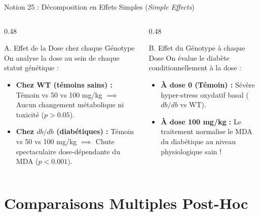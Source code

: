 \documentclass[aspectratio=169,10pt]{beamer}
\begin{document}
\begin{frame}{Notion 25 : Décomposition en Effets Simples (\textit{Simple Effects})}
  \begin{columns}[onlytextwidth, T]
    \begin{column}{0.48\linewidth}
      \begin{biobox}{A. Effet de la Dose chez chaque Génotype}
        \small
        On analyse la dose au sein de chaque statut génétique :
        \begin{itemize}
          \item \textbf{Chez WT (témoins sains) :} Témoin vs 50 vs 100 mg/kg $\implies$ Aucun changement métabolique ni toxicité ($p > 0.05$).
          \item \textbf{Chez $db/db$ (diabétiques) :} Témoin vs 50 vs 100 mg/kg $\implies$ Chute spectaculaire dose-dépendante du MDA ($p < 0.001$).
        \end{itemize}
      \end{biobox}
    \end{column}
    \begin{column}{0.48\linewidth}
      \begin{conceptbox}{B. Effet du Génotype à chaque Dose}
        \small
        On évalue le diabète conditionnellement à la dose :
        \begin{itemize}
          \item \textbf{À dose 0 (Témoin) :} Sévère hyper-stress oxydatif basal ($db/db$ vs WT).
          \item \textbf{À dose 100 mg/kg :} Le traitement normalise le MDA du diabétique au niveau physiologique sain !
        \end{itemize}
      \end{conceptbox}
    \end{column}
  \end{columns}
\end{frame}

\section{Comparaisons Multiples Post-Hoc}
\end{document}

